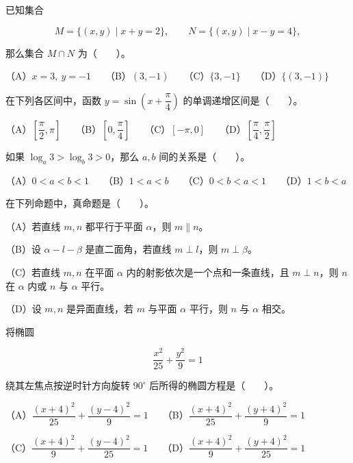 \begin{question}
已知集合

\nopagebreak[4]
\[
M=\{(x,y)\mid x+y=2\},\qquad N=\{(x,y)\mid x-y=4\},
\]

那么集合 $M\cap N$ 为\mbox{（　　）}。

（A）$x=3,\ y=-1$　　（B）$(3,-1)$　　（C）$\{3,-1\}$　　（D）$\{(3,-1)\}$

\end{question}
\begin{question}
在下列各区间中，函数 $y=\sin\left(x+\dfrac{\pi}{4}\right)$ 的单调递增区间是\mbox{（　　）}。

（A）$\left[\dfrac{\pi}{2},\pi\right]$　　（B）$\left[0,\dfrac{\pi}{4}\right]$　　（C）$[-\pi,0]$　　（D）$\left[\dfrac{\pi}{4},\dfrac{\pi}{2}\right]$

\end{question}
\begin{question}
如果 $\log_a3>\log_b3>0$，那么 $a,b$ 间的关系是\mbox{（　　）}。

（A）$0<a<b<1$　　（B）$1<a<b$　　（C）$0<b<a<1$　　（D）$1<b<a$

\end{question}
\begin{question}
在下列命题中，真命题是\mbox{（　　）}。

（A）若直线 $m,n$ 都平行于平面 $\alpha$，则 $m\parallel n$。

（B）设 $\alpha-l-\beta$ 是直二面角，若直线 $m\perp l$，则 $m\perp\beta$。

（C）若直线 $m,n$ 在平面 $\alpha$ 内的射影依次是一个点和一条直线，且 $m\perp n$，则 $n$ 在 $\alpha$ 内或 $n$ 与 $\alpha$ 平行。

（D）设 $m,n$ 是异面直线，若 $m$ 与平面 $\alpha$ 平行，则 $n$ 与 $\alpha$ 相交。

\end{question}
\begin{question}
将椭圆

\nopagebreak[4]
\[
\dfrac{x^2}{25}+\dfrac{y^2}{9}=1
\]

绕其左焦点按逆时针方向旋转 $90^\circ$ 后所得的椭圆方程是\mbox{（　　）}。

（A）$\dfrac{(x+4)^2}{25}+\dfrac{(y-4)^2}{9}=1$　　（B）$\dfrac{(x+4)^2}{25}+\dfrac{(y+4)^2}{9}=1$

（C）$\dfrac{(x+4)^2}{9}+\dfrac{(y-4)^2}{25}=1$　　（D）$\dfrac{(x+4)^2}{9}+\dfrac{(y+4)^2}{25}=1$

\end{question}
